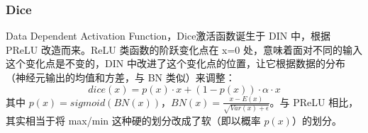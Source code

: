 \subsubsection{Dice}
Data Dependent Activation Function，Dice激活函数诞生于 DIN 中，根据 PReLU 改造而来。ReLU 类函数的阶跃变化点在 x=0 处，意味着面对不同的输入这个变化点是不变的，DIN 中改进了这个变化点的位置，让它根据数据的分布（神经元输出的均值和方差，与 BN 类似）来调整：
$$
dice(x) = p(x) \cdot x + (1 - p(x)) \cdot \alpha \cdot x
$$
其中 $p(x) = sigmoid( BN(x))$，$BN(x) = \frac{x - E(x)}{\sqrt{Var(x) + \epsilon}}$。与 PReLU 相比，其实相当于将 max/min 这种硬的划分改成了软（即以概率 $p(x)$）的划分。